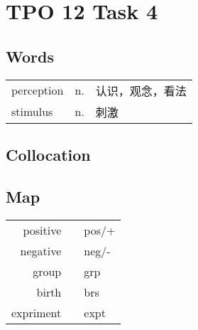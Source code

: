 \section{TPO 12 Task 4}

\subsection{Words}

\begin{tabular}{lll}
    perception & n. & 认识，观念，看法 \\
    stimulus   & n. & 刺激       \\
\end{tabular}

\subsection{Collocation}

\subsection{Map}

\begin{tabular}{rc@{\quad$\to$\quad}l}
    positive  &  & pos/+ \\
    negative  &  & neg/- \\
    group     &  & grp   \\
    birth     &  & brs   \\
    expriment &  & expt  \\
\end{tabular}

\newpage
